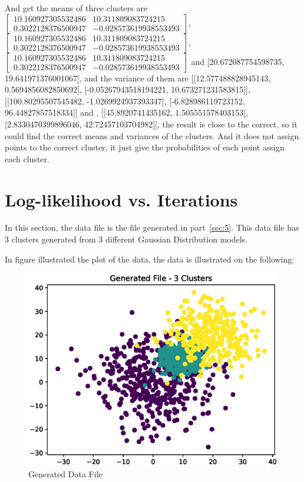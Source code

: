 \documentclass[11pt, a4paper]{article}
\begin{document}
\newpage

And get the means of three clusters are $\begin{bmatrix}
	10.160927305532486 & 10.311809083724215 \\ 0.3022128376500947 & -0.028573619938553493 \end{bmatrix}$, $ \begin{bmatrix}
10.160927305532486 & 10.311809083724215 \\ 0.3022128376500947 & -0.028573619938553493
	\end{bmatrix}$, $\begin{bmatrix}
		10.160927305532486 & 10.311809083724215 \\ 0.3022128376500947 & -0.028573619938553493 
	\end{bmatrix}$ and  [20.672087754598735, 19.641971376001067], and the variance of them are [[12.577488828945143, 0.5694856082850692], [-0.05267943518194221, 10.673271231583815]], [[100.80295507545482, -1.0269924937393347], [-6.828986119723152, 96.44827857518334]] and , [[45.8920741435162, 1.505551578403153], [2.8330470399896046, 42.72457103704982]], the result is close to the correct, so it could find the correct means and variances of the clusters. And it does not assign points to the correct cluster, it just give the probabilities of each point assign each cluster.




\section{Log-likelihood vs. Iterations}

In this section, the data file is the file generated in part~\ref{sec:5}. This data file has 3 clusters generated from 3 different Gaussian Distribution models.

In figure illustrated the plot of the data, the data is illustrated on the following:

\begin{figure}[htbp]
	
	\centering 
	\includegraphics[width=12cm]{6.eps}
	
	\caption{Generated Data File}
	\label{fig:kf8}
	
\end{figure}
\end{document}
